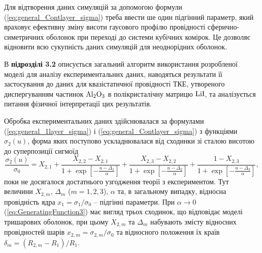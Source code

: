 \documentclass[twoside,a4paper,14pt]{vakaref-utf8}
\begin{document}
Для відтворення даних симуляцій \cite{Siekierski2006} за допомогою формули (\ref{eq:general_Contlayer_sigma}) треба ввести ше один підгінний параметр, який враховує ефективну зміну висоти  гаусового профілю провідності сферично-симетричних оболонок при переході до системи кубічних комірок. Це дозволяє відновити всю сукупність даних симуляцій \cite{Siekierski2006} для неоднорідних оболонок.

В {\bf підрозділі 3.2} описується загальний алгоритм використання розробленої моделі для аналізу експериментальних даних, наводяться результати її застосуван\-ня до даних \cite{Liang1973} для квазістатичної провідності ТКЕ, утвореного диспергуванням частинок $\rm Al_2O_3$ в полікристалічну матрицю $\rm LiI$, та аналізується питання фізичної інтерпретації цих результатів.

Обробка експериментальних даних здійснювалася за формулами (\ref{eq:general_1layer_sigma}) і (\ref{eq:general_Contlayer_sigma}) з функціями $\sigma_2(u)$, форма яких поступово ускладнювалася від сходинки зі сталою висотою до суперпозиції сигмоїд
\begin{equation}\label{eq:GeneratingFunction3}
\frac{\sigma_2(u)}{\sigma_0} = X_{2,1} +
\frac{X_{2,2}-X_{2,1}}
{1+\exp\left[-\frac{u-\Delta_1}{\alpha}\right]}
+\frac{X_{2,3}-X_{2,2}}{1+\exp\left[-\frac{u-\Delta_2}{\alpha}\right]}
+\frac{1-X_{2,3}}{1+\exp\left[-\frac{u-\Delta_3}{\alpha}\right]},
\end{equation}
поки не досягалося достатнього узгодження теорії з експериментом. Тут величини $X_{2,m}$, $\Delta_m$ ($m=1,2,3$), $\alpha$ та, в загальному випадку, відносна провідність ядра $x_1=\sigma_1/\sigma_0$ -- підгінні параметри. При $\alpha \to 0$ (\ref{eq:GeneratingFunction3}) має вигляд трьох сходинок, що відповідає моделі тришарових оболонок, при цьому $X_{2,m}$ та $\Delta_m$ набувають змісту відносних провідностей шарів $x_{2,m} = \sigma_{2,m}/\sigma_0$ та  відносного положення їх країв $\delta_m = (R_{2,m}-R_1)/R_1$.
\end{document}

